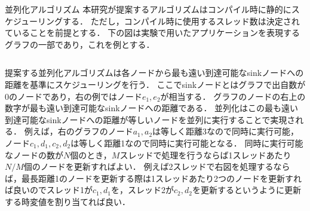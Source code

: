 \documentclass[dvipdfmx,final,t,10pt]{beamer}
\begin{document}
\begin{frame}[fragile]
    \begin{block}{並列化アルゴリズム}
        \vskip 0.25cm
        本研究が提案するアルゴリズムはコンパイル時に静的にスケジューリングする．
        ただし，コンパイル時に使用するスレッド数は決定されていることを前提とする．
        下の図は実験で用いたアプリケーションを表現するグラフの一部であり，これを例とする．
        \begin{columns}
            \begin{column}{0.665\textwidth}
                提案する並列化アルゴリズムは各ノードから最も遠い到達可能なsinkノードへの距離を基準にスケジューリングを行う．
                ここでsinkノードとはグラフで出自数が0のノードであり，右の例ではノード$e_1,e_2$が相当する．
                グラフのノードの右上の数字が最も遠い到達可能なsinkノードへの距離である．
                並列化はこの最も遠い到達可能なsinkノードへの距離が等しいノードを並列に実行することで実現される．
                例えば，右のグラフのノード$a_1,a_2$は等しく距離3なので同時に実行可能，ノード$c_1,d_1,c_2,d_2$は等しく距離1なので同時に実行可能となる．
                同時に実行可能なノードの数が$N$個のとき，$M$スレッドで処理を行うならば1スレッドあたり$N/M$個のノードを更新すればよい．
                例えば2スレッドで右図を処理するならば，最長距離1のノードを更新する際は1スレッドあたり2つのノードを更新すれば良いのでスレッド1が$c_1,d_1$を，スレッド2が$c_2,d_2$を更新するというように更新する時変値を割り当てれば良い．

\end{column}
\end{columns}
\end{block}
\end{frame}
\end{document}
